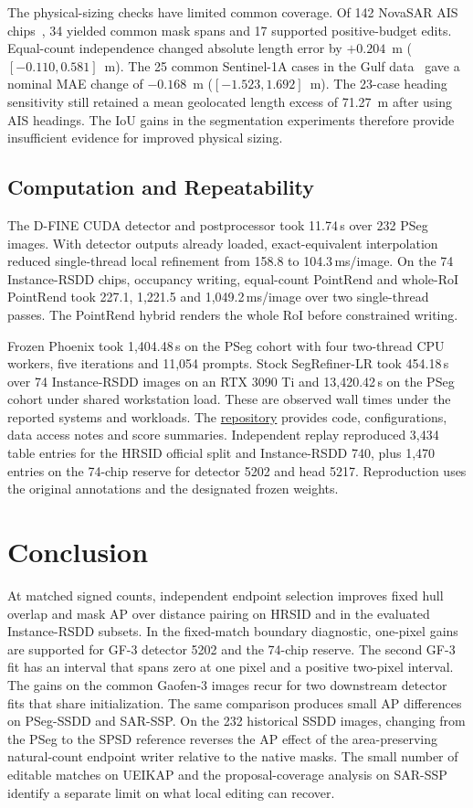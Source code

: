 \documentclass[journal]{IEEEtran}
\begin{document}
The physical-sizing checks have limited common coverage. Of 142 NovaSAR AIS chips~\cite{nastar}, 34 yielded common mask spans and 17 supported positive-budget edits. Equal-count independence changed absolute length error by \(+0.204\)~m (\([-0.110,0.581]\)~m). The 25 common Sentinel-1A cases in the Gulf data~\cite{gulf} gave a nominal MAE change of \(-0.168\)~m (\([-1.523,1.692]\)~m). The 23-case heading sensitivity still retained a mean geolocated length excess of 71.27~m after using AIS headings. The IoU gains in the segmentation experiments therefore provide insufficient evidence for improved physical sizing.

\subsection{Computation and Repeatability}
The D-FINE CUDA detector and postprocessor took 11.74\,s over 232 PSeg images. With detector outputs already loaded, exact-equivalent interpolation reduced single-thread local refinement from 158.8 to 104.3\,ms/image. On the 74 Instance-RSDD chips, occupancy writing, equal-count PointRend and whole-RoI PointRend took 227.1, 1,221.5 and 1,049.2\,ms/image over two single-thread passes. The PointRend hybrid renders the whole RoI before constrained writing.

Frozen Phoenix took 1,404.48\,s on the PSeg cohort with four two-thread CPU workers, five iterations and 11,054 prompts. Stock SegRefiner-LR took 454.18\,s over 74 Instance-RSDD images on an RTX 3090 Ti and 13,420.42\,s on the PSeg cohort under shared workstation load. These are observed wall times under the reported systems and workloads. The \href{https://github.com/bingzhi495-creator/SAR-SEAL-research}{repository} provides code, configurations, data access notes and score summaries. Independent replay reproduced 3,434 table entries for the HRSID official split and Instance-RSDD 740, plus 1,470 entries on the 74-chip reserve for detector 5202 and head 5217. Reproduction uses the original annotations and the designated frozen weights.

\section{Conclusion}
At matched signed counts, independent endpoint selection improves fixed hull overlap and mask AP over distance pairing on HRSID and in the evaluated Instance-RSDD subsets. In the fixed-match boundary diagnostic, one-pixel gains are supported for GF-3 detector 5202 and the 74-chip reserve. The second GF-3 fit has an interval that spans zero at one pixel and a positive two-pixel interval. The gains on the common Gaofen-3 images recur for two downstream detector fits that share initialization. The same comparison produces small AP differences on PSeg-SSDD and SAR-SSP. On the 232 historical SSDD images, changing from the PSeg to the SPSD reference reverses the AP effect of the area-preserving natural-count endpoint writer relative to the native masks. The small number of editable matches on UEIKAP and the proposal-coverage analysis on SAR-SSP identify a separate limit on what local editing can recover.
\end{document}
